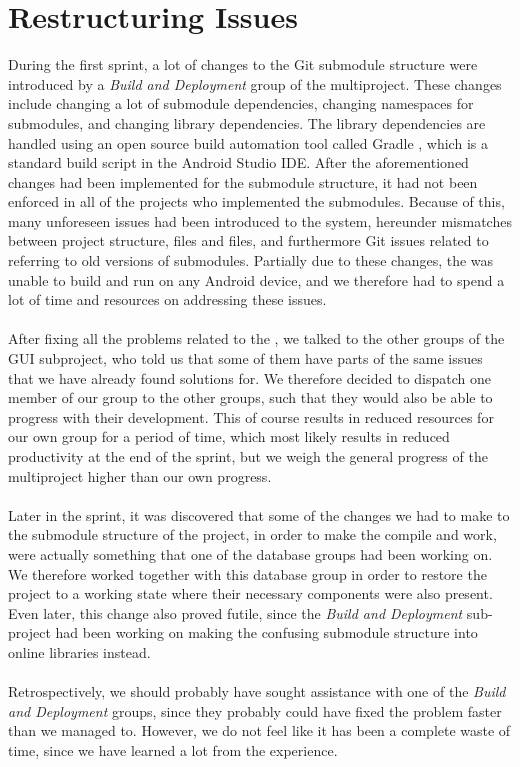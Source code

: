 \section{Restructuring Issues}
\label{sec:restructuring_issues}

During the first sprint, a lot of changes to the Git submodule structure were introduced by a \emph{Build and Deployment} group of the multiproject. These changes include changing a lot of submodule dependencies, changing namespaces for submodules, and changing library dependencies. The library dependencies are handled using an open source build automation tool called Gradle \parencite{gradle}, which is a standard build script in the Android Studio IDE. After the aforementioned changes had been implemented for the submodule structure, it had not been enforced in all of the \giraf projects who implemented the submodules. Because of this, many unforeseen issues had been introduced to the system, hereunder mismatches between project structure,  files and  files, and furthermore Git issues related to referring to old versions of submodules. Partially due to these changes, the \ct was unable to build and run on any Android device, and we therefore had to spend a lot of time and resources on addressing these issues. 
\\\\
After fixing all the problems related to the \ct, we talked to the other groups of the GUI subproject, who told us that some of them have parts of the same issues that we have already found solutions for. We therefore decided to dispatch one member of our group to the other groups, such that they would also be able to progress with their development. This of course results in reduced resources for our own group for a period of time, which most likely results in reduced productivity at the end of the sprint, but we weigh the general progress of the multiproject higher than our own progress.
\\\\
Later in the sprint, it was discovered that some of the changes we had to make to the submodule structure of the project, in order to make the \ct compile and work, were actually something that one of the database groups had been working on. We therefore worked together with this database group in order to restore the project to a working state where their necessary components were also present. Even later, this change also proved futile, since the \emph{Build and Deployment} sub-project had been working on making the confusing submodule structure into online libraries instead. 
\\\\
Retrospectively, we should probably have sought assistance with one of the \emph{Build and Deployment} groups, since they probably could have fixed the problem faster than we managed to. However, we do not feel like it has been a complete waste of time, since we have learned a lot from the experience.